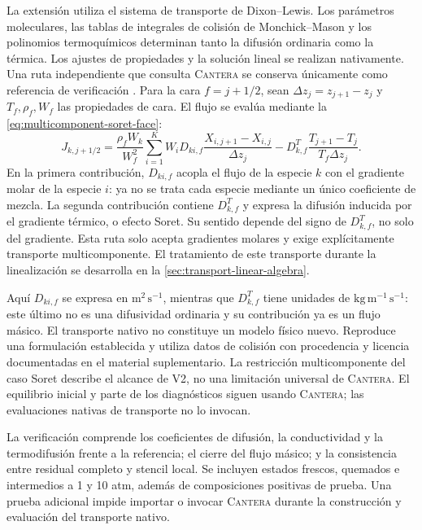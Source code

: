 \documentclass[12pt,a4paper,twoside,openany]{book}
\newcommand{\Cantera}{\textsc{Cantera}\xspace}
\begin{document}
La extensión utiliza el sistema de transporte de Dixon--Lewis. Los parámetros
moleculares, las tablas de integrales de colisión de Monchick--Mason y los
polinomios termoquímicos determinan tanto la difusión ordinaria como la térmica.
Los ajustes de propiedades y la solución lineal se realizan nativamente. Una
ruta independiente que consulta \Cantera se conserva únicamente como referencia
de verificación \cite{CanteraDocs32}. Para la cara \(f=j+1/2\), sean
\(\Delta z_j=z_{j+1}-z_j\) y \(T_f,\rho_f,W_f\) las propiedades de cara.
El flujo se evalúa mediante la \cref{eq:multicomponent-soret-face}:
\begin{equation}
 J_{k,j+1/2}=\frac{\rho_f W_k}{W_f^2}
 \sum_{i=1}^K W_iD_{ki,f}
 \frac{X_{i,j+1}-X_{i,j}}{\Delta z_j}
 -D_{k,f}^{T}\frac{T_{j+1}-T_j}{T_f\Delta z_j}.
 \label{eq:multicomponent-soret-face}
\end{equation}
En la primera contribución, \(D_{ki,f}\) acopla el flujo de la especie \(k\)
con el gradiente molar de la especie \(i\): ya no se trata cada especie mediante
un único coeficiente de mezcla. La segunda contribución contiene \(D^T_{k,f}\)
y expresa la difusión inducida por el gradiente térmico, o efecto Soret.
Su sentido depende del signo de \(D^T_{k,f}\), no solo del gradiente. Esta ruta
solo acepta gradientes molares y exige explícitamente transporte
multicomponente. El tratamiento de este transporte durante la linealización se desarrolla en
la \cref{sec:transport-linear-algebra}.

Aquí \(D_{ki,f}\) se expresa en \(\mathrm{m^2\,s^{-1}}\), mientras que
\(D_{k,f}^{T}\) tiene unidades de \(\mathrm{kg\,m^{-1}\,s^{-1}}\): este
último no es una difusividad ordinaria y su contribución ya es un flujo másico.
El transporte nativo no constituye un modelo físico nuevo. Reproduce una
formulación establecida y utiliza datos de colisión con procedencia y licencia
documentadas en el material suplementario. La restricción multicomponente
del caso Soret describe el alcance de V2, no una limitación universal de
\Cantera. El equilibrio inicial y parte de los diagnósticos siguen usando
\Cantera; las evaluaciones nativas de transporte no lo invocan.

La verificación comprende los coeficientes de difusión, la conductividad y la
termodifusión frente a la referencia; el cierre del flujo másico; y la
consistencia entre residual completo y stencil local. Se incluyen estados
frescos, quemados e intermedios a 1 y 10 atm, además de composiciones positivas
de prueba. Una prueba adicional impide importar o invocar \Cantera durante la
construcción y evaluación del transporte nativo.
\end{document}
